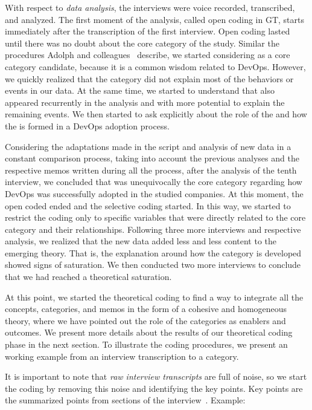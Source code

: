 With respect to \emph{data analysis}, the interviews were
voice recorded, transcribed, and analyzed. The first moment
of the analysis, called open coding in GT, starts immediately after the
transcription of the first interview.
Open coding lasted until there was no
doubt about the core category of the study. Similar the procedures
Adolph and colleagues~\cite{adolph2012reconciling} describe, we started
considering  as a core category candidate, because it is a common
wisdom related to DevOps. However, we quickly
realized that the  category did not explain most of the behaviors
or events in our data. At the same time, we started to understand that
\cc also appeared recurrently in the analysis and with more
potential to explain the remaining events. We then started to ask explicitly
about the role of the  and how the \cc is formed
in a DevOps adoption process.

Considering the adaptations made in the script and analysis of new data in a constant
comparison process, taking into account the previous analyses and the
respective memos written during all the process, after the analysis of the tenth
interview, we concluded that \cc was unequivocally the core
category regarding how DevOps was successfully adopted in the studied companies.
At this moment, the open coded ended and the selective coding started.
In this way, we started to restrict the coding only
to specific variables that were directly related to the core category and their
relationships. Following three more interviews and respective analysis, we realized that
the new data added less and less content to the emerging theory. That is, the
explanation around how the \cc category is developed showed signs of saturation.
We then conducted two more interviews to conclude that we had reached a
theoretical saturation.

At this point, we started the theoretical coding to find a way to integrate
all the concepts, categories, and memos in the form of a cohesive and
homogeneous theory, where we have pointed out the role of the categories as
enablers and outcomes. We present more details about
the results of our theoretical coding phase in the next section.
To illustrate the coding procedures, we present an working example from an
interview transcription to a category.

It is important to note that \emph{raw interview transcripts} are full of noise,
so we start the coding by removing this noise and identifying the key points.
Key points are the summarized points from sections of the interview~\cite{georgieva2008best}. Example:

